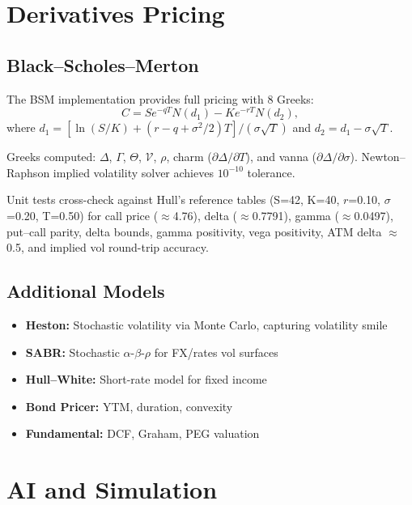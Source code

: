\documentclass[11pt]{article}
\theoremstyle{definition}
\begin{document}
\section{Derivatives Pricing}
\label{sec:pricing}

\subsection{Black--Scholes--Merton}

The BSM implementation provides full pricing with 8 Greeks:
\begin{equation}
  C = S e^{-qT} N(d_1) - K e^{-rT} N(d_2),
  \label{eq:bsm}
\end{equation}
where $d_1 = [\ln(S/K) + (r - q + \sigma^2/2)T] / (\sigma\sqrt{T})$
and $d_2 = d_1 - \sigma\sqrt{T}$.

Greeks computed: $\Delta$, $\Gamma$, $\Theta$, $\mathcal{V}$,
$\rho$, charm ($\partial\Delta/\partial T$), and vanna
($\partial\Delta/\partial\sigma$). Newton--Raphson implied
volatility solver achieves $10^{-10}$ tolerance.

Unit tests cross-check against Hull's reference tables (S=42,
K=40, $r$=0.10, $\sigma$=0.20, T=0.50) for call price
($\approx$4.76), delta ($\approx$0.7791), gamma ($\approx$0.0497),
put--call parity, delta bounds, gamma positivity, vega positivity,
ATM delta $\approx$0.5, and implied vol round-trip accuracy.

\subsection{Additional Models}
\begin{itemize}[leftmargin=*,topsep=2pt,itemsep=1pt]
  \item \textbf{Heston:} Stochastic volatility via Monte Carlo,
        capturing volatility smile
  \item \textbf{SABR:} Stochastic $\alpha$-$\beta$-$\rho$ for
        FX/rates vol surfaces
  \item \textbf{Hull--White:} Short-rate model for fixed income
  \item \textbf{Bond Pricer:} YTM, duration, convexity
  \item \textbf{Fundamental:} DCF, Graham, PEG valuation
\end{itemize}

\section{AI and Simulation}
\label{sec:ai}
\end{document}
